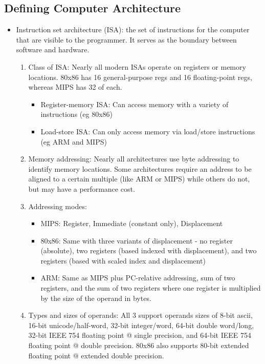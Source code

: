 \documentclass[11pt, a4paper]{article}
\theoremstyle{definition}
\theoremstyle{remark}
\begin{document}
\subsection{Defining Computer Architecture}
\begin{itemize}
    \item Instruction set architecture (ISA): the set of instructions for the computer that are visible to the programmer. It serves as the boundary between software and hardware.
    \begin{enumerate}
        \item Class of ISA: Nearly all modern ISAs operate on registers or memory locations. 80x86 has 16 general-purpose regs and 16 floating-point regs, whereas MIPS has 32 of each.
        \begin{itemize}
            \item Register-memory ISA: Can access memory with a variety of instructions (eg 80x86)
            \item Load-store ISA: Can only access memory via load/store instructions (eg ARM and MIPS)
        \end{itemize}
        \item Memory addressing: Nearly all architectures use byte addressing to identify memory locations. Some architectures require an address to be aligned to a certain multiple (like ARM or MIPS) while others do not, but may have a performance cost.
        \item Addressing modes: 
        \begin{itemize}
            \item MIPS: Register, Immediate (constant only), Displacement
            \item 80x86: Same with three variants of displacement - no register (absolute), two registers (based indexed with displacement), and two registers (based with scaled index and displacement) 
            \item ARM: Same as MIPS plus PC-relative addressing, sum of two registers, and the sum of two registers where one register is multiplied by the size of the operand in bytes.
        \end{itemize}
        \item Types and sizes of operands: All 3 support operands sizes of 8-bit ascii, 16-bit unicode/half-word, 32-bit integer/word, 64-bit double word/long, 32-bit IEEE 754 floating point @ single precision, and 64-bit IEEE 754 floating point @ double precision. 80x86 also supports 80-bit extended floating point @ extended double precision.

\end{enumerate}
\end{itemize}
\end{document}
